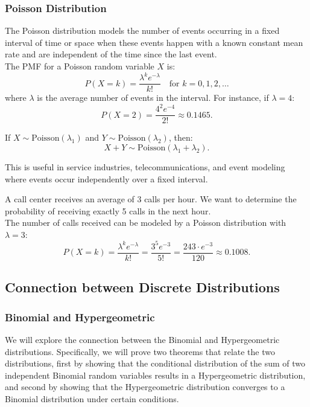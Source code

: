 \subsubsection{Poisson Distribution}

The Poisson distribution models the number of events occurring in a fixed interval of time or space when these events happen with a known constant mean rate and are independent of the time since the last event.\\

The PMF for a Poisson random variable \( X \) is:
\[
P(X = k) = \frac{\lambda^k e^{-\lambda}}{k!} \quad \text{for } k = 0, 1, 2, \ldots
\]
where \( \lambda \) is the average number of events in the interval. For instance, if \( \lambda = 4 \):
\[
P(X = 2) = \frac{4^2 e^{-4}}{2!} \approx 0.1465.
\]

If \( X \sim \text{Poisson}(\lambda_1) \) and \( Y \sim \text{Poisson}(\lambda_2) \), then:
\[
X + Y \sim \text{Poisson}(\lambda_1 + \lambda_2).
\]

This is useful in service industries, telecommunications, and event modeling where events occur independently over a fixed interval.

\begin{example}
    A call center receives an average of 3 calls per hour. We want to determine the probability of receiving exactly 5 calls in the next hour.\\
    
    The number of calls received can be modeled by a Poisson distribution with \( \lambda = 3 \):
\[
P(X = k) = \frac{\lambda^k e^{-\lambda}}{k!} = \frac{3^5 e^{-3}}{5!} = \frac{243 \cdot e^{-3}}{120} \approx 0.1008.
\]
\end{example}

\subsection{Connection between Discrete Distributions}

\subsubsection{Binomial and Hypergeometric}

We will explore the connection between the Binomial and Hypergeometric distributions. Specifically, we will prove two theorems that relate the two distributions, first by showing that the conditional distribution of the sum of two independent Binomial random variables results in a Hypergeometric distribution, and second by showing that the Hypergeometric distribution converges to a Binomial distribution under certain conditions. \\

